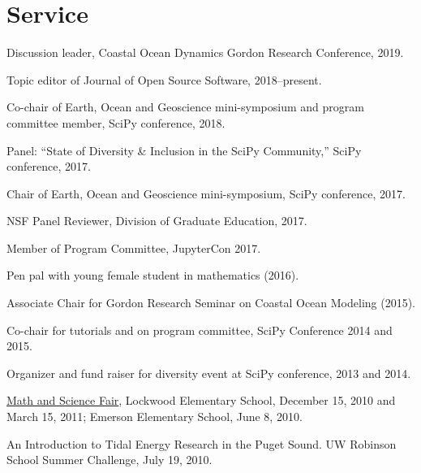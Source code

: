 \documentclass[10pt,letterpaper]{article}
\renewenvironment{itemize}{
  \begin{list}{}{
    \setlength{\leftmargin}{1.5em}
    \setlength{\itemsep}{0.25em}
    \setlength{\parskip}{0pt}
    \setlength{\parsep}{0.25em}
  }
}{
  \end{list}
}
\begin{document}
\section*{Service}
\begin{itemize}
  \item Discussion leader, Coastal Ocean Dynamics Gordon Research Conference, 2019.
  \item Topic editor of Journal of Open Source Software, 2018--present.
  \item Co-chair of Earth, Ocean and Geoscience mini-symposium and program committee member, SciPy conference, 2018.
  \item Panel: ``State of Diversity \& Inclusion in the SciPy Community,'' SciPy conference, 2017.
  \item Chair of Earth, Ocean and Geoscience mini-symposium, SciPy conference, 2017.
  \item NSF Panel Reviewer, Division of Graduate Education, 2017.
  \item Member of Program Committee, JupyterCon 2017.
  \item Pen pal with young female student in mathematics (2016).
  \item Associate Chair for Gordon Research Seminar on Coastal Ocean Modeling (2015).
  \item Co-chair for tutorials and on program committee, SciPy Conference 2014 and 2015.
  \item Organizer and fund raiser for diversity event at SciPy conference, 2013 and 2014.
	\item \href{http://www.amath.washington.edu/~siamuw/math-fair.html}{Math and Science Fair}, Lockwood Elementary School, December 15, 2010 and March 15, 2011; Emerson Elementary School, June 8, 2010.
	\item An Introduction to Tidal Energy Research in the Puget Sound. UW Robinson School Summer Challenge, July 19, 2010.

\end{itemize}
\end{document}
